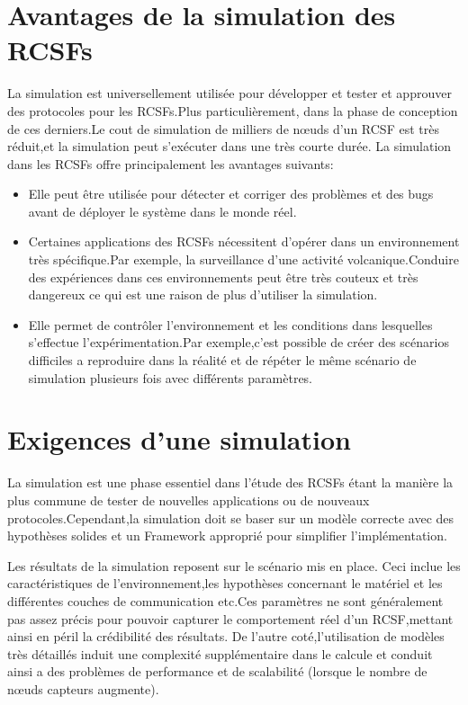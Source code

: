 \section{Avantages de la simulation des RCSFs}
La simulation est universellement utilisée pour développer et tester et approuver des protocoles pour les RCSFs.Plus particulièrement,  dans la phase de conception de ces derniers.Le cout de simulation de milliers de nœuds d'un RCSF est très réduit,et la simulation peut s'exécuter dans une très courte durée.
La simulation dans les RCSFs offre principalement les avantages suivants:
\begin{itemize}

\item Elle peut être utilisée pour détecter et corriger des problèmes et des bugs avant de  déployer le système dans le monde réel.
\item Certaines applications des RCSFs nécessitent d'opérer dans un environnement très spécifique.Par exemple, la surveillance d'une activité volcanique.Conduire des expériences dans ces environnements peut être très couteux et très dangereux ce qui est une raison de plus d'utiliser la simulation.
\item Elle permet de contrôler l'environnement et les conditions dans lesquelles s'effectue l'expérimentation.Par exemple,c'est possible de créer des scénarios difficiles a reproduire dans la réalité    et de répéter le même scénario de simulation plusieurs fois avec différents paramètres.   

\end{itemize}
\section{Exigences d'une simulation}
La simulation est une phase essentiel dans l'étude des RCSFs étant la manière la plus commune de tester de nouvelles applications ou de nouveaux protocoles.Cependant,la simulation doit se baser sur  un modèle correcte avec des hypothèses solides et un Framework approprié pour simplifier l'implémentation.

Les résultats de la simulation reposent sur le scénario mis en place. Ceci inclue les caractéristiques de l'environnement,les hypothèses concernant le matériel et les différentes couches de communication etc.Ces paramètres ne sont généralement pas assez précis  pour pouvoir capturer le comportement réel d'un RCSF,mettant ainsi en péril la crédibilité des résultats.
De l'autre coté,l'utilisation de modèles très détaillés induit une complexité supplémentaire dans le calcule et conduit ainsi a des  problèmes de performance et de scalabilité (lorsque le nombre de nœuds capteurs augmente).

